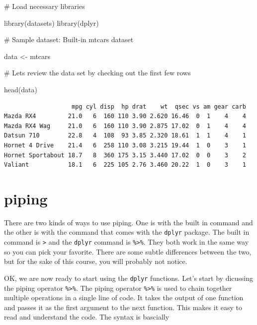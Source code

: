 \documentclass[
  letterpaper,
  DIV=11,
  numbers=noendperiod]{scrreprt}
\newenvironment{Shaded}{\begin{snugshade}}{\end{snugshade}}
\newcommand{\CommentTok}[1]{\textcolor[rgb]{0.37,0.37,0.37}{#1}}
\newcommand{\FunctionTok}[1]{\textcolor[rgb]{0.28,0.35,0.67}{#1}}
\newcommand{\NormalTok}[1]{\textcolor[rgb]{0.00,0.23,0.31}{#1}}
\newcommand{\OtherTok}[1]{\textcolor[rgb]{0.00,0.23,0.31}{#1}}
\begin{document}
\begin{Shaded}
\begin{Highlighting}[]
\CommentTok{\# Load necessary libraries}

\FunctionTok{library}\NormalTok{(datasets)}
\FunctionTok{library}\NormalTok{(dplyr)}

\CommentTok{\# Sample dataset: Built{-}in mtcars dataset}

\NormalTok{data }\OtherTok{\textless{}{-}}\NormalTok{ mtcars}

\CommentTok{\# Let\textquotesingle{}s review the data set by checking out the first few rows}

\FunctionTok{head}\NormalTok{(data)}
\end{Highlighting}
\end{Shaded}

\begin{verbatim}
                   mpg cyl disp  hp drat    wt  qsec vs am gear carb
Mazda RX4         21.0   6  160 110 3.90 2.620 16.46  0  1    4    4
Mazda RX4 Wag     21.0   6  160 110 3.90 2.875 17.02  0  1    4    4
Datsun 710        22.8   4  108  93 3.85 2.320 18.61  1  1    4    1
Hornet 4 Drive    21.4   6  258 110 3.08 3.215 19.44  1  0    3    1
Hornet Sportabout 18.7   8  360 175 3.15 3.440 17.02  0  0    3    2
Valiant           18.1   6  225 105 2.76 3.460 20.22  1  0    3    1
\end{verbatim}

\section*{piping}\label{piping}


There are two kinds of ways to use piping. One is with the built in
command and the other is with the command that comes with the
\texttt{dplyr} package. The built in command is
\texttt{\textbar{}\textgreater{}} and the \texttt{dplyr} command is
\texttt{\%\textgreater{}\%}. They both work in the same way so you can
pick your favorite. There are some subtle differences between the two,
but for the sake of this course, you will probably not notice.

OK, we are now ready to start using the \texttt{dplyr} functions. Let's
start by dicussing the piping operator \texttt{\%\textgreater{}\%}. The
piping operator \texttt{\%\textgreater{}\%} is used to chain together
multiple operations in a single line of code. It takes the output of one
function and passes it as the first argument to the next function. This
makes it easy to read and understand the code. The syntax is bascially
\end{document}
